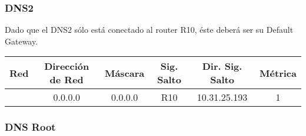 \subsubsection{DNS2}
Dado que el DNS2 sólo está conectado al router R10, éste deberá ser su Default Gateway.
\begin{tabular}{|c|c|c|c|c|c|}
	\hline
	Red & Dirección de Red & Máscara & Sig. Salto & Dir. Sig. Salto & Métrica \\
	\hline
	& 0.0.0.0 & 0.0.0.0 & R10 & 10.31.25.193 & 1\\
	\hline
\end{tabular}

\subsubsection{DNS Root}

